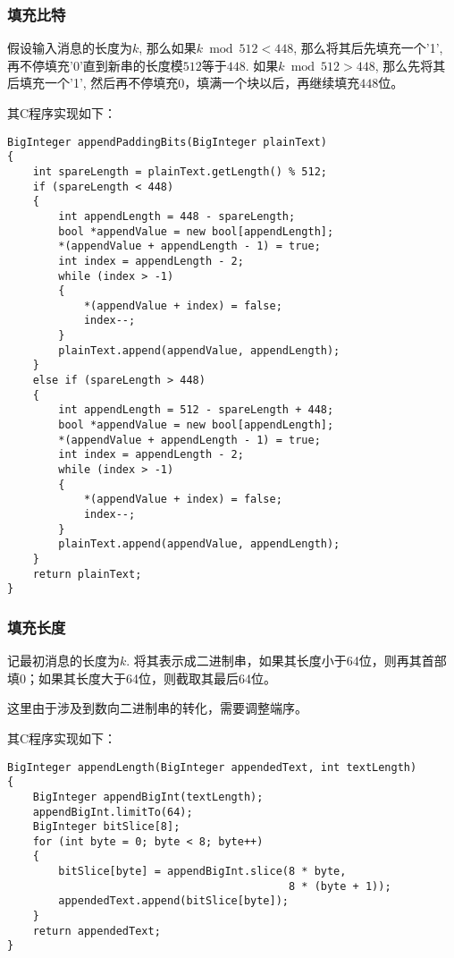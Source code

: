 \subsubsection{填充比特}
假设输入消息的长度为$k$, 那么如果$k\bmod{512}<448$, 那么将其后先填充一个'1', 再不停填充'0'直到新串的长度模$512$等于$448$. 如果$k\bmod{512}>448$, 那么先将其后填充一个'1', 然后再不停填充0，填满一个块以后，再继续填充$448$位。\par
其C程序实现如下：
\begin{prove}
\begin{verbatim}
BigInteger appendPaddingBits(BigInteger plainText)
{
    int spareLength = plainText.getLength() % 512;
    if (spareLength < 448)
    {
        int appendLength = 448 - spareLength;
        bool *appendValue = new bool[appendLength];
        *(appendValue + appendLength - 1) = true;
        int index = appendLength - 2;
        while (index > -1)
        {
            *(appendValue + index) = false;
            index--;
        }
        plainText.append(appendValue, appendLength);
    }
    else if (spareLength > 448)
    {
        int appendLength = 512 - spareLength + 448;
        bool *appendValue = new bool[appendLength];
        *(appendValue + appendLength - 1) = true;
        int index = appendLength - 2;
        while (index > -1)
        {
            *(appendValue + index) = false;
            index--;
        }
        plainText.append(appendValue, appendLength);
    }
    return plainText;
}
\end{verbatim}
\end{prove}
\subsubsection{填充长度}
记最初消息的长度为$k$. 将其表示成二进制串，如果其长度小于64位，则再其首部填0；如果其长度大于64位，则截取其最后64位。\par
这里由于涉及到数向二进制串的转化，需要调整端序。\par
其C程序实现如下：
\begin{prove}
\begin{verbatim}
BigInteger appendLength(BigInteger appendedText, int textLength)
{
    BigInteger appendBigInt(textLength);
    appendBigInt.limitTo(64);
    BigInteger bitSlice[8];
    for (int byte = 0; byte < 8; byte++)
    {
        bitSlice[byte] = appendBigInt.slice(8 * byte, 
                                            8 * (byte + 1));
        appendedText.append(bitSlice[byte]);
    }
    return appendedText;
}
\end{verbatim}
\end{prove}
